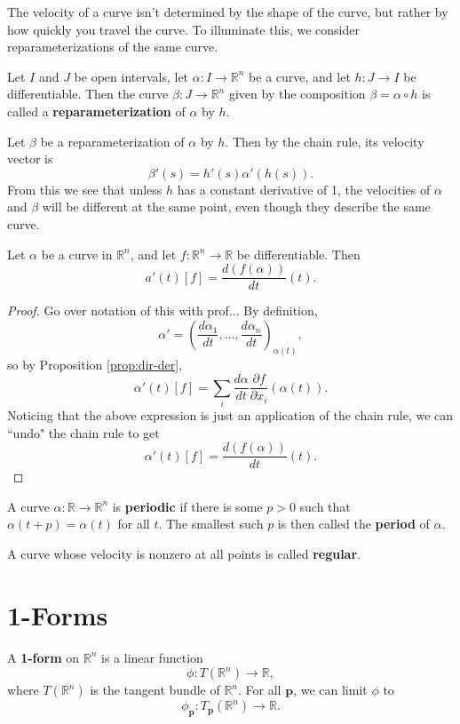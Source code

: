 \documentclass[10pt]{report}
\begin{document}
The velocity of a curve isn't determined by the shape of the curve, but rather by how quickly you travel the curve. To illuminate this, we consider reparameterizations of the same curve.

\begin{defn}
	Let $I$ and $J$ be open intervals, let $\alpha:I\to \mathbb{R}^n$ be a curve, and let $h:J\to I$ be differentiable. Then the curve $\beta:J\to \mathbb{R}^n$ given by the composition $\beta = \alpha \circ h$ is called a \textbf{reparameterization} of $\alpha$ by $h$.
\end{defn}

Let $\beta$ be a reparameterization of $\alpha$ by $h$. Then by the chain rule, its velocity vector is
\[
	\beta'(s) = h'(s) \alpha'(h(s)).
\] 
From this we see that unless $h$ has a constant derivative of 1, the velocities of $\alpha$ and $\beta$ will be different at the same point, even though they describe the same curve.

\begin{prop}
Let $\alpha$ be a curve in $\mathbb{R}^n$, and let $f:\mathbb{R}^n\to \mathbb{R}$ be differentiable. Then
\[
	a'(t)[f] = \frac{d (f(\alpha))}{d t} (t).
\] 
\end{prop}
\begin{proof}
	{\color{red}Go over notation of this with prof...}
	By definition,
	\[
		\alpha' = \left( \frac{d \alpha_1}{d t} , \dots, \frac{d \alpha_n}{d t}  \right)_{\alpha(t)},
	\] so by Proposition \ref{prop:dir-der},
	\[
		\alpha'(t)[f] = \sum_i \frac{d \alpha}{d t}  \frac{\partial f}{\partial x_i} (\alpha(t)).
	\] Noticing that the above expression is just an application of the chain rule, we can ``undo" the chain rule to get
	\[
		\alpha'(t)[f] = \frac{d (f(\alpha))}{d t} (t).
	\] 
\end{proof}

A curve $\alpha:\mathbb{R}\to \mathbb{R}^n$ is \textbf{periodic} if there is some $p>0$ such that $\alpha(t+p) = \alpha(t)$ for all $t$. The smallest such $p$ is then called the \textbf{period} of $\alpha$.

A curve whose velocity is nonzero at all points is called \textbf{regular}.



\section{1-Forms}

\begin{defn}
A \textbf{1-form} on $\mathbb{R}^n$ is a linear function
\[
	\phi:T(\mathbb{R}^n)\to \mathbb{R},
\] where $T(\mathbb{R}^n)$ is the tangent bundle of $\mathbb{R}^n$. For all $\mathbf{p}$, we can limit $\phi$ to
\[
	\phi_\mathbf{p}:T_{\mathbf{p}}(\mathbb{R}^n)\to \mathbb{R}.
\] 
\end{defn}
\end{document}
